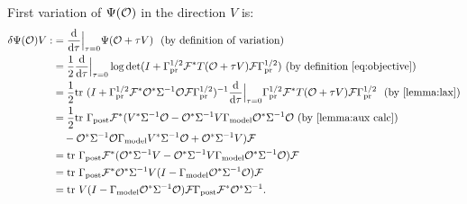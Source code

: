 \documentclass{amsart}
\numberwithin{equation}{section}
\begin{document}
First variation of $\Psi (\mathcal{O})$ in the direction $V$ is:
\begin{align*}%
  \begin{split}
    \delta \tar(\obs) V 
    :&= \frac{\der}{\der\tau} \Big |_{\tau=0} \tar(\obs + \tau V)\  \text{ (by definition of variation)}\\
    &= \frac12 \frac{\der}{\der \tau} \Big |_{\tau=0} \log \det 
    (I + \prcov^{1/2} \fwd^* T(\obs+\tau V)\fwd \prcov^{1/2} ) \text{ (by definition \eqref{eq:objective})}\\
    &= \frac12 \tr ( I + \prcov^{1/2} \fwd^* \obs^* \Sigma^{-1}
    \obs\fwd \prcov^{1/2} )^{-1}
    \frac{\der}{\der \tau} \Big |_{\tau=0}
    \prcov^{1/2} \fwd^* T(\obs+\tau V) \fwd \prcov^{1/2}\ \text{ (by \ref{lemma:lax})}\\
    &= \frac12 \tr \postcov \fwd^* (
      V^* \Sigma^{-1} \obs 
      - \obs^*\Sigma^{-1} V\modcov \obs^* \Sigma^{-1}\obs \text{ (by \ref{lemma:aux calc})}\\
      &\ \ \ - \obs^* \Sigma^{-1} \obs \modcov V^* \Sigma^{-1}\obs
      + \obs^* \Sigma^{-1} V ) \fwd \\
    &= \tr \postcov \fwd^* ( \obs^* \Sigma^{-1} V 
    - \obs^*\Sigma^{-1} V\modcov \obs^* \Sigma^{-1}\obs ) \fwd \\
    &= \tr \postcov \fwd^* \obs^* \Sigma^{-1} V 
    ( I - \modcov \obs^* \Sigma^{-1}\obs ) \fwd \\
    &= \tr V ( I - \modcov \obs^* \Sigma^{-1}\obs )
    \fwd \postcov \fwd^* \obs^* \Sigma^{-1}.
  \end{split}
\end{align*} 
\end{document}
